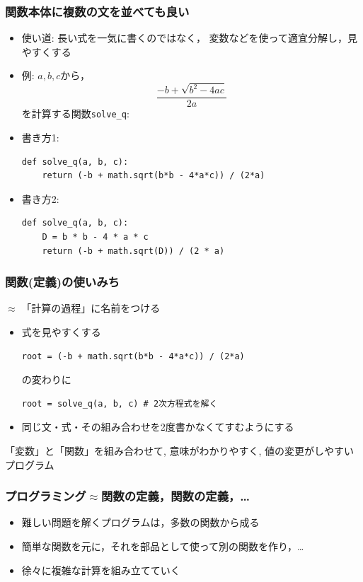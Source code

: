 \documentclass[10pt,dvipdfmx]{beamer}
\newcommand{\ao}[1]{{\color{blue}#1}}
\begin{document}
\begin{frame}[fragile]
\frametitle{関数本体に複数の文を並べても良い}
\begin{itemize}
\item 使い道: 長い式を一気に書くのではなく，
  変数などを使って適宜分解し，見やすくする
\item 
例: $a, b, c$から，
\[ \frac{-b + \sqrt{b^2 - 4 ac}}{2a} \]
を計算する関数{\tt solve\_q}:
\item 書き方1:
\begin{lstlisting}
def solve_q(a, b, c):
    return (-b + math.sqrt(b*b - 4*a*c)) / (2*a)
\end{lstlisting}
\item 書き方2:
\begin{lstlisting}
def solve_q(a, b, c):
    D = b * b - 4 * a * c
    return (-b + math.sqrt(D)) / (2 * a)
\end{lstlisting}
\end{itemize}
\end{frame}

\begin{frame}[fragile]
  \frametitle{関数(定義)の使いみち}
  $\approx$ 「計算の過程」に名前をつける
  \begin{itemize}
  \item 式を見やすくする
\begin{lstlisting}
root = (-b + math.sqrt(b*b - 4*a*c)) / (2*a)      
\end{lstlisting}
の変わりに
\begin{lstlisting}
root = solve_q(a, b, c) # 2次方程式を解く
\end{lstlisting}
\item 同じ文・式・その組み合わせを2度書かなくてすむようにする
  \end{itemize}

  \ao{「変数」と「関数」を組み合わせて,
    意味がわかりやすく, 値の変更がしやすいプログラム}
\end{frame}
  
\begin{frame}
\frametitle{プログラミング$\approx$関数の定義，関数の定義，\ldots}
\begin{itemize}
\item 難しい問題を解くプログラムは，多数の関数から成る
\item 簡単な関数を元に，それを部品として使って別の関数を作り，\ldots
\item 徐々に複雑な計算を組み立てていく
\end{itemize}

\end{frame}
\end{document}
